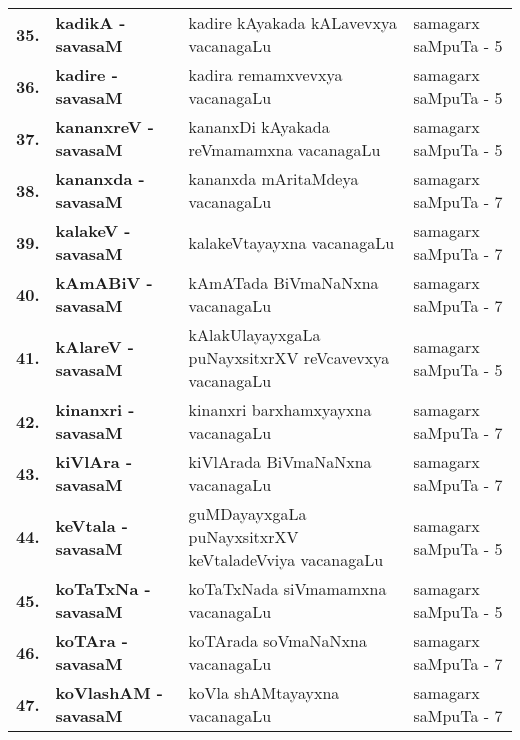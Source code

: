 {\renewcommand{\arraystretch}{1.3}
\begin{longtable}{>{\bf}r>{\bf}l>{\raggedright}p{8cm}l}
\endfirsthead
\endhead
\endfoot
\endlastfoot
35. &  kadikA - savasaM &  kadire kAyakada kALavevxya vacanagaLu & samagarx saMpuTa - 5\\
36. &  kadire - savasaM &  kadira remamxvevxya vacanagaLu & samagarx saMpuTa - 5\\
37. &  kananxreV - savasaM & kananxDi kAyakada reVmamamxna vacanagaLu & samagarx saMpuTa - 5 \\
38. &  kananxda - savasaM & kananxda mAritaMdeya vacanagaLu & samagarx saMpuTa - 7 \\
39. &  kalakeV - savasaM & kalakeVtayayxna vacanagaLu & samagarx saMpuTa - 7 \\
40. &  kAmABiV - savasaM & kAmATada BiVmaNaNxna vacanagaLu & samagarx saMpuTa - 7 \\
41. &  kAlareV - savasaM & kAlakUlayayxgaLa puNayxsitxrXV reVcavevxya vacanagaLu & samagarx saMpuTa - 5 \\
42. &  kinanxri - savasaM & kinanxri barxhamxyayxna vacanagaLu & samagarx saMpuTa - 7 \\
43. &  kiVlAra - savasaM & kiVlArada BiVmaNaNxna vacanagaLu & samagarx saMpuTa - 7 \\
44. &  keVtala - savasaM & guMDayayxgaLa puNayxsitxrXV keVtaladeVviya vacanagaLu & samagarx saMpuTa - 5 \\
45. &  koTaTxNa - savasaM & koTaTxNada siVmamamxna vacanagaLu & samagarx saMpuTa - 5 \\
46. &  koTAra - savasaM & koTArada soVmaNaNxna vacanagaLu & samagarx saMpuTa - 7 \\
47. &  koVlashAM - savasaM & koVla shAMtayayxna vacanagaLu & samagarx saMpuTa - 7
\end{longtable}}
\smallskip

